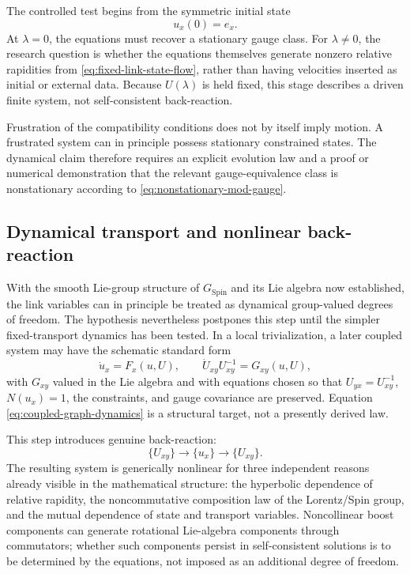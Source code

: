 \documentclass[11pt,a4paper]{article}
\theoremstyle{remark}
\newcommand{\SpinG}{G_{\mathrm{Spin}}}
\begin{document}
The controlled test begins from the symmetric initial state
\begin{equation}
  u_x(0)=e_x.
\tag{5.18}
\end{equation}
At \(\lambda=0\), the equations must recover a stationary gauge class.  For \(\lambda\ne0\), the research question is whether the equations themselves generate nonzero relative rapidities from \eqref{eq:fixed-link-state-flow}, rather than having velocities inserted as initial or external data.  Because \(U(\lambda)\) is held fixed, this stage describes a driven finite system, not self-consistent back-reaction.

Frustration of the compatibility conditions does not by itself imply motion.  A frustrated system can in principle possess stationary constrained states.  The dynamical claim therefore requires an explicit evolution law and a proof or numerical demonstration that the relevant gauge-equivalence class is nonstationary according to \eqref{eq:nonstationary-mod-gauge}.

\subsection{Dynamical transport and nonlinear back-reaction}

With the smooth Lie-group structure of \(\SpinG\) and its Lie algebra now established, the link variables can in principle be treated as dynamical group-valued degrees of freedom.  The hypothesis nevertheless postpones this step until the simpler fixed-transport dynamics has been tested.  In a local trivialization, a later coupled system may have the schematic standard form
\begin{equation}
  \dot u_x=F_x(u,U),
  \qquad
  \dot U_{xy}U_{xy}^{-1}=G_{xy}(u,U),
\tag{5.19}\label{eq:coupled-graph-dynamics}
\end{equation}
with \(G_{xy}\) valued in the Lie algebra and with equations chosen so that \(U_{yx}=U_{xy}^{-1}\), \(N(u_x)=1\), the constraints, and gauge covariance are preserved.  Equation \eqref{eq:coupled-graph-dynamics} is a structural target, not a presently derived law.

This step introduces genuine back-reaction:
\[
  \{U_{xy}\}
  \longrightarrow
  \{u_x\}
  \longrightarrow
  \{U_{xy}\}.
\]
The resulting system is generically nonlinear for three independent reasons already visible in the mathematical structure: the hyperbolic dependence of relative rapidity, the noncommutative composition law of the Lorentz/Spin group, and the mutual dependence of state and transport variables.  Noncollinear boost components can generate rotational Lie-algebra components through commutators; whether such components persist in self-consistent solutions is to be determined by the equations, not imposed as an additional degree of freedom.
\end{document}
